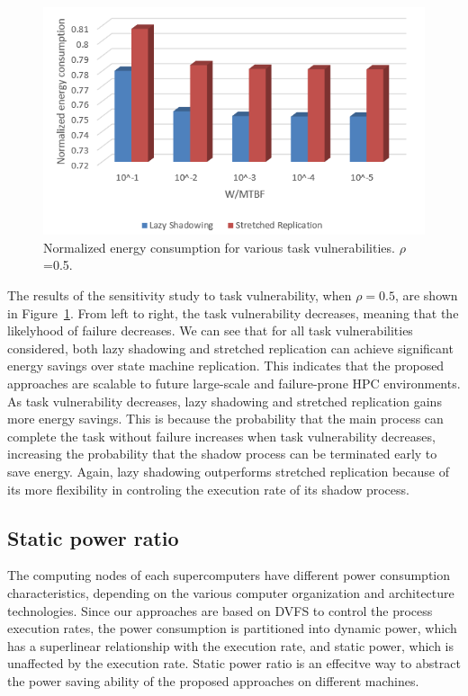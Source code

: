 \begin{figure}[!t]	
	\begin{center}
		\includegraphics[width=\columnwidth]{figures/vulnerability.png}
	\end{center}
	\caption{Normalized energy consumption for various task vulnerabilities. $\rho$=0.5.}
	\label{fig:vulnerability}
\end{figure}

The results of the sensitivity study to task vulnerability, when $\rho=0.5$, are shown in Figure~\ref{fig:vulnerability}. From left to right, the task vulnerability decreases, meaning that the likelyhood of failure decreases. We can see that for all task vulnerabilities considered, both lazy shadowing and stretched replication can achieve significant energy savings over state machine replication. This indicates that the proposed approaches are scalable to future large-scale and failure-prone HPC environments. As task vulnerability decreases, lazy shadowing and stretched replication gains more energy savings. This is because the probability that the main process can complete the task without failure increases when task vulnerability decreases, increasing the probability that the shadow process can be terminated early to save energy. Again, lazy shadowing outperforms stretched replication because of its more flexibility in controling the execution rate of its shadow process.

\subsection{Static power ratio}
The computing nodes of each supercomputers have different power consumption characteristics, depending on the various computer organization and architecture technologies. Since our approaches are based on DVFS to control the process execution rates, the power consumption is partitioned into dynamic power, which has a superlinear relationship with the execution rate, and static power, which is unaffected by the execution rate. Static power ratio is an effecitve way to abstract the power saving ability of the proposed approaches on different machines.

